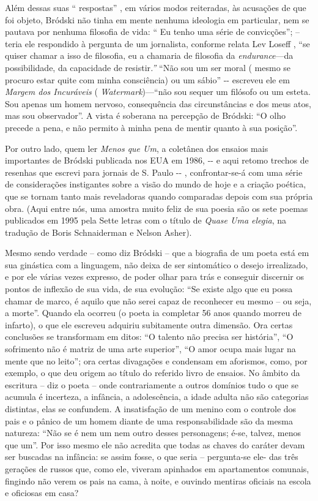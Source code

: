 Além dessas suas `` respostas'' , em vários modos reiteradas, às
acusações de que foi objeto, Bródski não tinha em mente nenhuma
ideologia em particular, nem se pautava por nenhuma filosofia de vida:
`` Eu tenho uma série de convicções''; -- teria ele respondido à
pergunta de um jornalista, conforme relata Lev Loseff , ``se quiser
chamar a isso de filosofia, eu a chamaria de filosofia da
\emph{endurance}---da possibilidade, da capacidade de resistir\emph{.''}
``Não sou um ser moral ( mesmo se procuro estar quite com minha
consciência) ou um sábio'' -\/- escreveu ele em \emph{Margem dos
Incuráveis} ( \emph{Watermark})---``não sou sequer um filósofo ou um
esteta. Sou apenas um homem nervoso, consequência das circunstâncias e
dos meus atos, mas sou observador''. A vista é soberana na percepção de
Bródski: ``O olho precede a pena, e não permito à minha pena de mentir
quanto à sua posição''.

Por outro lado, quem ler \emph{Menos que Um}, a coletânea dos ensaios
mais importantes de Bródski publicada nos EUA em 1986, -\/- e aqui
retomo trechos de resenhas que escrevi para jornais de S. Paulo -\/- ,
confrontar-se-á com uma série de considerações instigantes sobre a visão
do mundo de hoje e a criação poética, que se tornam tanto mais
reveladoras quando comparadas depois com sua própria obra. (Aqui entre
nós, uma amostra muito feliz de sua poesia são os sete poemas publicados
em 1995 pela Sette letras com o título de \emph{Quase Uma elegia}, na
tradução de Boris Schnaiderman e Nelson Asher).

Mesmo sendo verdade -- como diz Bródski -- que a biografia de um poeta
está em sua ginástica com a linguagem, não deixa de ser sintomático o
desejo irrealizado, e por ele várias vezes expresso, de poder olhar para
trás e conseguir discernir os pontos de inflexão de sua vida, de sua
evolução: ``Se existe algo que eu possa chamar de marco, é aquilo que
não serei capaz de reconhecer eu mesmo -- ou seja, a morte''. Quando ela
ocorreu (o poeta ia completar 56 anos quando morreu de infarto), o que
ele escreveu adquiriu subitamente outra dimensão. Ora certas conclusões
se transformam em ditos: ``O talento não precisa ser história'', ``O
sofrimento não é matriz de uma arte superior'', ``O amor ocupa mais
lugar na mente que no leito''; ora certas divagações e condensam em
aforismos, como, por exemplo, o que deu origem ao título do referido
livro de ensaios. No âmbito da escritura -- diz o poeta -- onde
contrariamente a outros domínios tudo o que se acumula é incerteza, a
infância, a adolescência, a idade adulta não são categorias distintas,
elas se confundem. A insatisfação de um menino com o controle dos pais e
o pânico de um homem diante de uma responsabilidade são da mesma
natureza: ``Não se é nem um nem outro desses personagens; é-se, talvez,
menos que um''. Por isso mesmo ele não acredita que todas as chaves do
caráter devam ser buscadas na infância: se assim fosse, o que seria --
pergunta-se ele- das três gerações de russos que, como ele, viveram
apinhados em apartamentos comunais, fingindo não verem os pais na cama,
à noite, e ouvindo mentiras oficiais na escola e oficiosas em casa?

